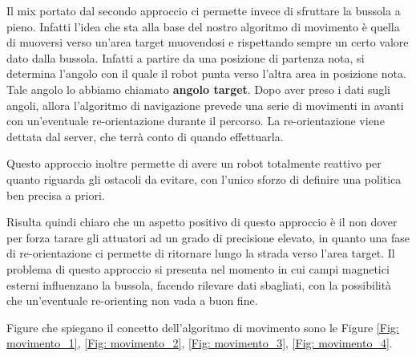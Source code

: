 \documentclass[a4paper,12pt,italian]{article}
\begin{document}
Il mix portato dal secondo approccio ci permette invece di sfruttare la bussola a pieno. Infatti l'idea che sta alla base del nostro algoritmo di movimento è quella di muoversi verso un'area target muovendosi e rispettando sempre un certo valore dato dalla bussola. Infatti a partire da una posizione di partenza nota, si determina l'angolo con il quale il robot punta verso l'altra area in posizione nota. Tale angolo lo abbiamo chiamato \textbf{angolo target}. Dopo aver preso i dati sugli angoli, allora l'algoritmo di navigazione prevede una serie di movimenti in avanti con un'eventuale re-orientazione durante il percorso. La re-orientazione viene dettata dal server, che terrà conto di quando effettuarla.

Questo approccio inoltre permette di avere un robot totalmente reattivo per quanto riguarda gli ostacoli da evitare, con l'unico sforzo di definire una politica ben precisa a priori. 

Risulta quindi chiaro che un aspetto positivo di questo approccio è il non dover per forza tarare gli attuatori ad un grado di precisione elevato, in quanto una fase di re-orientazione ci permette di ritornare lungo la strada verso l'area target. Il problema di questo approccio si presenta nel momento in cui campi magnetici esterni influenzano la bussola, facendo rilevare dati sbagliati, con la possibilità che un'eventuale re-orienting non vada a buon fine.

Figure che spiegano il concetto dell'algoritmo di movimento sono le Figure \ref{Fig: movimento_1}, \ref{Fig: movimento_2}, \ref{Fig: movimento_3}, \ref{Fig: movimento_4}.
\end{document}

